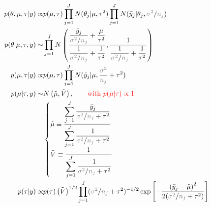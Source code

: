\begin{align*}
    p(\theta ,\mu ,\tau|y)\propto & p(\mu ,\tau)\prod_{j=1}^J N(\theta _j|\mu ,\tau^2)\prod_{j=1}^JN(\bar{y}_j|\theta _j,\fixed{\sigma ^2}/\fixed{n_j})\\
    p(\theta |\mu ,\tau,y)\sim &\prod_{j=1}^J N\left( \dfrac{ \dfrac{ \bar{y}_j }{ \fixed{\sigma ^2}/\fixed{n_j} } + \dfrac{ \mu  }{ \tau^2 }  }{ \dfrac{ 1 }{ \fixed{\sigma ^2}/\fixed{n_j} } + \dfrac{ 1  }{ \tau^2 } } , \dfrac{ 1 }{ \dfrac{ 1 }{ \fixed{\sigma ^2}/\fixed{n_j} } + \dfrac{ 1  }{ \tau^2 } }  \right)\\
    p(\mu ,\tau |y)\propto & p(\mu ,\tau)\prod_{j=1}^J N(\bar{y}_j| \mu , \dfrac{ \fixed{\sigma ^2} }{ \fixed{n_j} }+\tau^2 )\\
    p(\mu |\tau, y)\sim & N\left( \tilde{\mu },\tilde{V} \right),\qquad \text{\color{red}with }\color{red}p(\mu |\tau)\propto 1\\
    & \begin{cases}
        \tilde{\mu }\equiv {\dfrac{ \displaystyle \sum_{j=1}^J \dfrac{ \bar{y}_j }{ \fixed{\sigma ^2}/\fixed{n_j}+\tau^2 }  }{ \displaystyle \sum_{j=1}^J \dfrac{ 1 }{ \fixed{\sigma ^2}/\fixed{n_j}+\tau^2 } }}\\
        \tilde{V}\equiv {\dfrac{ 1 }{ \displaystyle \sum_{j=1}^J \dfrac{ 1 }{ \fixed{\sigma ^2}/\fixed{n_j}+\tau^2 } }}
    \end{cases}\\
    p(\tau|y)\propto & p(\tau)\left(\tilde{V}\right)^{1/2}\prod_{j=1}^J(\fixed{\sigma ^2}/\fixed{n_j}+\tau^2 )^{-1/2}\exp\left[ -\dfrac{ \left(\bar{y}_j -\tilde{\mu } \right)^2 }{ 2(\fixed{\sigma ^2}/\fixed{n_j}+\tau^2 ) }  \right]
\end{align*}